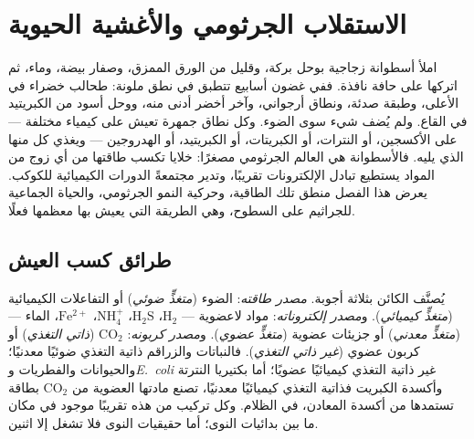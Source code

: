 \chapter{الاستقلاب الجرثومي والأغشية الحيوية}\label{ch:b2:microbial-metabolism}

املأ أسطوانة زجاجية بوحل بركة، وقليل من الورق الممزق، وصفار بيضة،
وماء، ثم اتركها على حافة نافذة. ففي غضون أسابيع تتطبق في نطق ملونة:
طحالب خضراء في الأعلى، وطبقة صدئة، ونطاق أرجواني، وآخر أخضر أدنى
منه، ووحل أسود من الكبريتيد في القاع. ولم يُضف شيء سوى الضوء. وكل
نطاق جمهرة تعيش على كيمياء مختلفة --- على الأكسجين، أو النترات، أو
الكبريتات، أو الكبريتيد، أو الهدروجين --- ويغذي كل منها الذي يليه.
فالأسطوانة هي العالم الجرثومي مصغرًا: خلايا تكسب طاقتها من أي زوج
من المواد يستطيع تبادل الإلكترونات تقريبًا، وتدير مجتمعةً الدورات
الكيميائية للكوكب. يعرض هذا الفصل منطق تلك الطاقية، وحركية النمو
الجرثومي، والحياة الجماعية للجراثيم على السطوح، وهي الطريقة التي
يعيش بها معظمها فعلًا.

\section{طرائق كسب العيش}

\begin{definition}\label{def:b2:microbial-metabolism:trophic}
يُصنَّف الكائن بثلاثة أجوبة. \emph{مصدر طاقته}: الضوء
(\emph{متغذٍّ ضوئي}) أو التفاعلات الكيميائية (\emph{متغذٍّ كيميائي}).
و\emph{مصدر إلكتروناته}: مواد لاعضوية --- $\mathrm{H_2}$،
$\mathrm{H_2S}$، $\mathrm{NH_4^+}$، $\mathrm{Fe^{2+}}$، الماء ---
(\emph{متغذٍّ معدني}) أو جزيئات عضوية (\emph{متغذٍّ عضوي}).
و\emph{مصدر كربونه}: $\mathrm{CO_2}$ (\emph{ذاتي التغذي}) أو كربون
عضوي (\emph{غير ذاتي التغذي}). فالنباتات والزراقم ذاتية التغذي
ضوئيًا معدنيًا؛ والحيوانات والفطريات و\emph{E.~coli} غير ذاتية
التغذي كيميائيًا عضويًا؛ أما بكتيريا النترتة وأكسدة الكبريت فذاتية
التغذي كيميائيًا معدنيًا، تصنع مادتها العضوية من $\mathrm{CO_2}$
بطاقة تستمدها من أكسدة المعادن، في الظلام. وكل تركيب من هذه تقريبًا
موجود في مكان ما بين بدائيات النوى؛ أما حقيقيات النوى فلا تشغل إلا
اثنين.
\end{definition}

